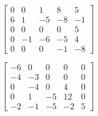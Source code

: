 \begin{exercise}
\begin{Parts}
\item \(\begin{bmatrix} 0 & 0 & 1 & 8 & 5
\\6 & 1 & -5 & -8 & -1
\\0 & 0 & 0 & 0 & 5
\\0 & -1 & -6 & -5 & 4
\\0 & 0 & 0 & -1 & -8 \end{bmatrix}\)

\item \(\begin{bmatrix} -6 & 0 & 0 & 0 & 0
\\-4 & -3 & 0 & 0 & 0
\\0 & -4 & 0 & 4 & 0
\\0 & 1 & -5 & 12 & 0
\\-2 & -1 & -5 & -2 & 5 \end{bmatrix}\)

\end{Parts}
\end{exercise}




